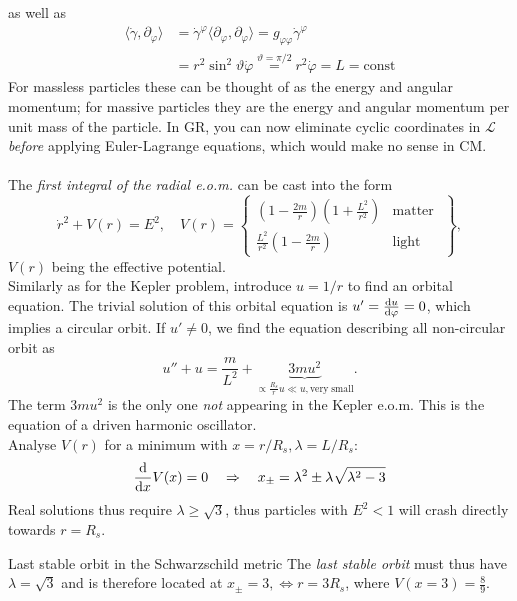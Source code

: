 	as well as
	\begin{align}
		\langle \dot{\gamma},\partial_{\varphi} \rangle &= \dot{\gamma}^{\varphi} \langle \partial_{\varphi},\partial_{\varphi} \rangle = g_{\varphi \varphi} \dot{\gamma}^{\varphi}\\
		&= r^2 \sin^2\vartheta \dot{\varphi}\stackrel{\vartheta=\pi/2}{=}r^2 \dot{\varphi} = L = \mathrm{const}
	\end{align}
	For massless particles these can be thought of as the energy and angular momentum; for
	massive particles they are the energy and angular momentum per unit mass of the particle.
	In GR, you can now eliminate cyclic coordinates in $\mathcal{L}$ \emph{before} applying Euler-Lagrange equations, which would make no sense in CM.
	\\
	\\
	The \emph{first integral of the radial e.o.m.} can be cast into the form
	\begin{equation}
	\dot{r}^2 + V(r) = E^2,\quad V(r) = \left\{\begin{array}{lr}
	\left(1-\frac{2m}{r}\right)\left(1+\frac{L^2}{r^2}\right) & \text{matter }\\
	\frac{L^2}{r^2} \left(1-\frac{2m}{r}\right) & \text{light }\
	\end{array}\right\},
	\end{equation}
	$V(r)$ being the effective potential.\\
	Similarly as for the Kepler problem, introduce $u=1/r$ to find an orbital equation. The trivial solution of this orbital equation is $u'=\frac{\mathrm{d} u}{\mathrm{d} \varphi}=0$, which implies a circular orbit. If $u'\neq 0$, we find the equation describing all non-circular orbit as
	\begin{equation}
	u ''+ u= \frac{m}{L^2} + \underbrace{3 m u^2}_{\propto \frac{R_s}{r} u \ll u, \mathrm{very \; small}}.
	\end{equation}
	The term $3mu^2$ is the only one \emph{not} appearing in the Kepler e.o.m. This is the equation of a driven harmonic oscillator.\\
	Analyse $V(r)$ for a minimum with $x =r/R_s, \lambda=L/R_s$:
	\begin{equation}
	\frac{\mathrm{d}}{\mathrm{d} x} V(x) = 0 \quad \Rightarrow \quad x_{\pm} = \lambda^2 \pm \lambda \sqrt{\lambda^2-3}
	\end{equation}
	Real solutions thus require $\lambda \geq \sqrt{3}$, thus particles with $E^2<1$ will crash directly towards $r=R_s$.
	\begin{mybox}{Last stable orbit in the Schwarzschild metric}
		The \emph{last stable orbit} must thus have $\lambda = \sqrt{3}$ and is therefore located at $x_{\pm}=3, \Leftrightarrow r=3R_s$, where $V(x=3)=\frac{8}{9}$.
	\end{mybox}
	
